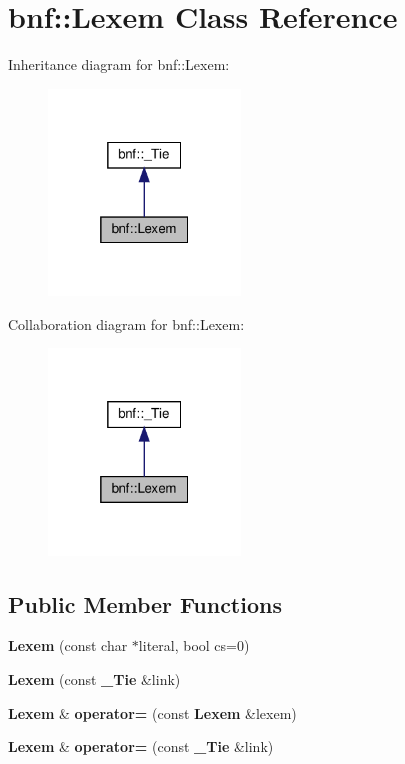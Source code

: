 \section{bnf\+:\+:Lexem Class Reference}
\label{classbnf_1_1_lexem}


Inheritance diagram for bnf\+:\+:Lexem\+:
\nopagebreak
\begin{figure}[H]
\begin{center}
\leavevmode
\includegraphics[width=145pt]{classbnf_1_1_lexem__inherit__graph}
\end{center}
\end{figure}


Collaboration diagram for bnf\+:\+:Lexem\+:
\nopagebreak
\begin{figure}[H]
\begin{center}
\leavevmode
\includegraphics[width=145pt]{classbnf_1_1_lexem__coll__graph}
\end{center}
\end{figure}
\subsection*{Public Member Functions}
\begin{DoxyCompactItemize}
\item 
\mbox{\label{classbnf_1_1_lexem_a6001a7f84ee1921163fde124d26cb041}} 
{\bfseries Lexem} (const char $\ast$literal, bool cs=0)
\item 
\mbox{\label{classbnf_1_1_lexem_a1fadc96def543467f41dc371adbfad06}} 
{\bfseries Lexem} (const \textbf{ \+\_\+\+Tie} \&link)
\item 
\mbox{\label{classbnf_1_1_lexem_afd4583e3492fddeea0d9a53914a976f9}} 
\textbf{ Lexem} \& {\bfseries operator=} (const \textbf{ Lexem} \&lexem)
\item 
\mbox{\label{classbnf_1_1_lexem_a06fead13730b94041d9487c707bbbd4e}} 
\textbf{ Lexem} \& {\bfseries operator=} (const \textbf{ \+\_\+\+Tie} \&link)
\end{DoxyCompactItemize}
